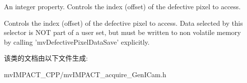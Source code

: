 An integer property. Controls the index (offset) of the defective pixel to access. 

Controls the index (offset) of the defective pixel to access. Data selected by this selector is N\+O\+T part of a user set, but must be written to non volatile memory by calling 'mv\+Defective\+Pixel\+Data\+Save' explicitly. 

该类的文档由以下文件生成\+:\begin{DoxyCompactItemize}
\item 
mv\+I\+M\+P\+A\+C\+T\+\_\+\+C\+P\+P/mv\+I\+M\+P\+A\+C\+T\+\_\+acquire\+\_\+\+Gen\+I\+Cam.\+h\end{DoxyCompactItemize}
